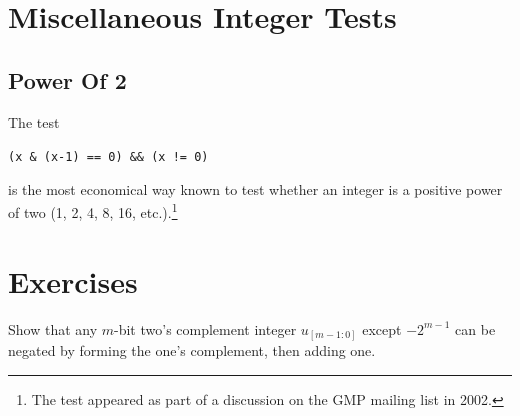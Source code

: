 \section{Miscellaneous Integer Tests}
\label{ccil0:smit0}

\subsection{Power Of 2}
\label{ccil0:smit0:sptw0}


The test

\texttt{(x \& (x-1) == 0) \&\& (x != 0)}

\noindent{}is the most economical way known to 
test whether an integer is a positive power of two 
(1, 2, 4, 8, 16, etc.).\footnote{The test appeared as part of
a discussion on 
the GMP mailing list in 2002.}


\section{Exercises}

\begin{vworkexercisestatement}
\label{exe:ccil0:sexe0:01}
Show that any $m$-bit two's complement integer $u_{[m-1:0]}$ except
$-2^{m-1}$ can be negated by forming the one's complement, then adding one.
\end{vworkexercisestatement}


